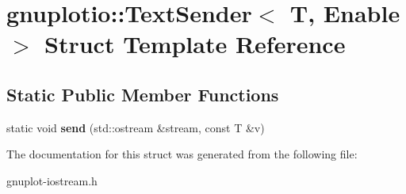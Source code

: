 \hypertarget{structgnuplotio_1_1TextSender}{}\section{gnuplotio\+:\+:Text\+Sender$<$ T, Enable $>$ Struct Template Reference}
\label{structgnuplotio_1_1TextSender}
\subsection*{Static Public Member Functions}
\begin{DoxyCompactItemize}
\item 
\mbox{\label{structgnuplotio_1_1TextSender_a03b58292dc75a4137d30ad7fffd762c6}} 
static void {\bfseries send} (std\+::ostream \&stream, const T \&v)
\end{DoxyCompactItemize}


The documentation for this struct was generated from the following file\+:\begin{DoxyCompactItemize}
\item 
gnuplot-\/iostream.\+h\end{DoxyCompactItemize}
